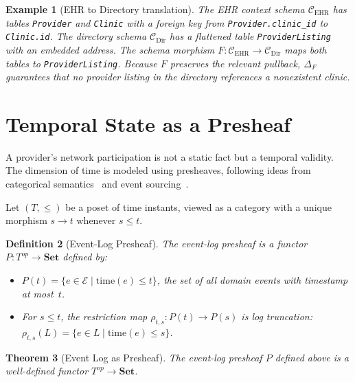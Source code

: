 \documentclass[11pt,a4paper]{article}
\newtheorem{definition}{Definition}[section]
\newtheorem{theorem}[definition]{Theorem}
\newtheorem{example}[definition]{Example}
\begin{document}
\begin{example}[EHR to Directory translation]
\label{ex:schema-translation}
The EHR context schema $\mathcal{C}_{\text{EHR}}$ has tables
\texttt{Provider} and \texttt{Clinic} with a foreign key from
\texttt{Provider.clinic\_id} to \texttt{Clinic.id}. The directory
schema $\mathcal{C}_{\text{Dir}}$ has a flattened table
\texttt{ProviderListing} with an embedded address. The schema morphism
$F:\mathcal{C}_{\text{EHR}}\to\mathcal{C}_{\text{Dir}}$ maps both
tables to \texttt{ProviderListing}. Because $F$ preserves the
relevant pullback, $\Delta_F$ guarantees that no provider listing in
the directory references a nonexistent clinic.
\end{example}

\section{Temporal State as a Presheaf}
\label{sec:temporal}

A provider's network participation is not a static fact but a temporal
validity. The dimension of time is modeled using presheaves, following
ideas from categorical semantics~\citep{moggi1991} and event
sourcing~\citep{fowler2005,kleppmann2017}.

Let $(T,\le)$ be a poset of time instants, viewed as a category with a
unique morphism $s\to t$ whenever $s\le t$.

\begin{definition}[Event-Log Presheaf]
\label{def:presheaf}
The \emph{event-log presheaf} is a functor $P:T^{op}\to\mathbf{Set}$
defined by:
\begin{itemize}
  \item $P(t) = \{e \in \mathcal{E} \mid \mathrm{time}(e) \le t\}$,
    the set of all domain events with timestamp at most~$t$.
  \item For $s\le t$, the restriction map $\rho_{t,s}:P(t)\to P(s)$
    is log truncation: $\rho_{t,s}(L) = \{e \in L \mid
    \mathrm{time}(e)\le s\}$.
\end{itemize}
\end{definition}

\begin{theorem}[Event Log as Presheaf]
\label{thm:presheaf}
The event-log presheaf $P$ defined above is a well-defined functor
$T^{op}\to\mathbf{Set}$.
\end{theorem}
\end{document}
